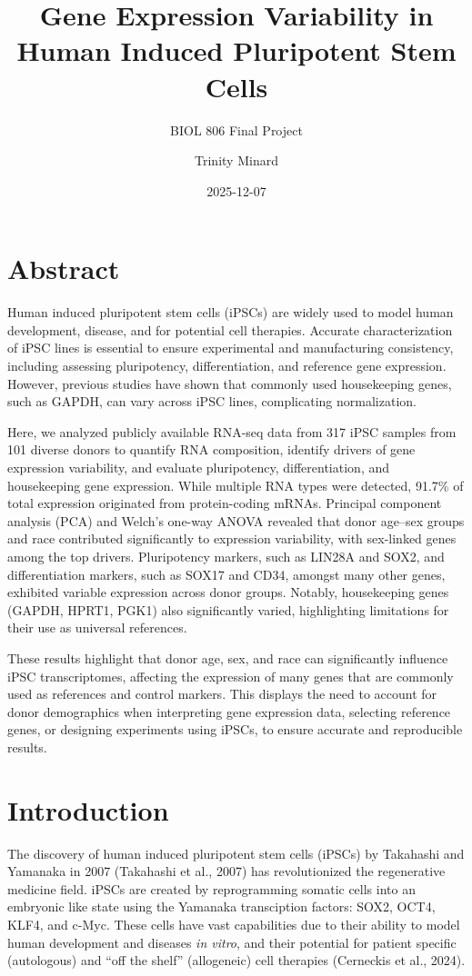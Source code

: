 \documentclass[
  letterpaper,
  DIV=11,
  numbers=noendperiod]{scrartcl}
\title{Gene Expression Variability in Human Induced Pluripotent Stem
Cells}
\subtitle{BIOL 806 Final Project}
\author{Trinity Minard}
\date{2025-12-07}
\begin{document}
\maketitle


\section{Abstract}\label{abstract}

Human induced pluripotent stem cells (iPSCs) are widely used to model
human development, disease, and for potential cell therapies. Accurate
characterization of iPSC lines is essential to ensure experimental and
manufacturing consistency, including assessing pluripotency,
differentiation, and reference gene expression. However, previous
studies have shown that commonly used housekeeping genes, such as GAPDH,
can vary across iPSC lines, complicating normalization.

Here, we analyzed publicly available RNA-seq data from 317 iPSC samples
from 101 diverse donors to quantify RNA composition, identify drivers of
gene expression variability, and evaluate pluripotency, differentiation,
and housekeeping gene expression. While multiple RNA types were
detected, 91.7\% of total expression originated from protein-coding
mRNAs. Principal component analysis (PCA) and Welch's one-way ANOVA
revealed that donor age--sex groups and race contributed significantly
to expression variability, with sex-linked genes among the top drivers.
Pluripotency markers, such as LIN28A and SOX2, and differentiation
markers, such as SOX17 and CD34, amongst many other genes, exhibited
variable expression across donor groups. Notably, housekeeping genes
(GAPDH, HPRT1, PGK1) also significantly varied, highlighting limitations
for their use as universal references.

These results highlight that donor age, sex, and race can significantly
influence iPSC transcriptomes, affecting the expression of many genes
that are commonly used as references and control markers. This displays
the need to account for donor demographics when interpreting gene
expression data, selecting reference genes, or designing experiments
using iPSCs, to ensure accurate and reproducible results.

\section{Introduction}\label{introduction}

The discovery of human induced pluripotent stem cells (iPSCs) by
Takahashi and Yamanaka in 2007 (Takahashi et al., 2007) has
revolutionized the regenerative medicine field. iPSCs are created by
reprogramming somatic cells into an embryonic like state using the
Yamanaka transciption factors: SOX2, OCT4, KLF4, and c-Myc. These cells
have vast capabilities due to their ability to model human development
and diseases \emph{in vitro}, and their potential for patient specific
(autologous) and ``off the shelf'' (allogeneic) cell therapies
(Cerneckis et al., 2024).
\end{document}
